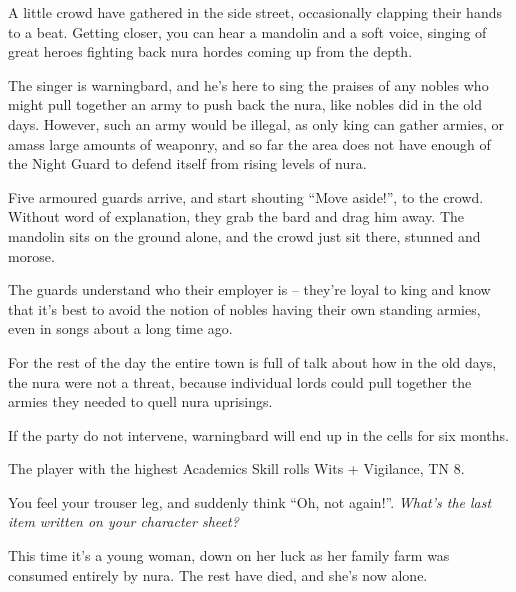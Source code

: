 \begin{multicols}{2}
\begin{boxtext}
	A little crowd have gathered in the side street, occasionally clapping their hands to a beat.
	Getting closer, you can hear a mandolin and a soft voice, singing of great heroes fighting back nura hordes coming up from the depth.
\end{boxtext}

The singer is \gls{warningbard}, and he's here to sing the praises of any nobles who might pull together an army to push back the nura, like nobles did in the old days.  However, such an army would be illegal, as only \gls{king} can gather armies, or amass large amounts of weaponry, and so far the area does not have enough of the Night Guard to defend itself from rising levels of nura.

\begin{boxtext}

	Five armoured guards arrive, and start shouting ``Move aside!'', to the crowd.  Without word of explanation, they grab the bard and drag him away.  The mandolin sits on the ground alone, and the crowd just sit there, stunned and morose.

\end{boxtext}

The guards understand who their employer is -- they're loyal to \gls{king} and know that it's best to avoid the notion of nobles having their own standing armies, even in songs about a long time ago.

For the rest of the day the entire town is full of talk about how in the old days, the nura were not a threat, because individual lords could pull together the armies they needed to quell nura uprisings.

If the party do not intervene, \gls{warningbard} will end up in the cells for six months.

\warningbard


The player with the highest Academics Skill rolls Wits + Vigilance, TN 8.

\begin{boxtext}

	You feel your trouser leg, and suddenly think ``Oh, not again!''.  \textit{What's the last item written on your character sheet?}

\end{boxtext}

This time it's a young woman, down on her luck as her family farm was consumed entirely by nura.
The rest have died, and she's now alone.


\end{multicols}

